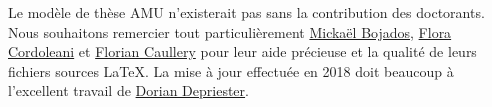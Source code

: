 Le modèle de thèse AMU n'existerait pas sans la contribution des doctorants. Nous souhaitons remercier tout particulièrement \href{http://www.theses.fr/2011AIX20720}{Mickaël Bojados}, \href{http://www.theses.fr/2011AIX22111}{Flora Cordoleani} et \href{http://www.theses.fr/2014AIXM4013}{Florian Caullery} pour leur aide précieuse et la qualité de leurs fichiers sources LaTeX. La mise à jour effectuée en 2018 doit beaucoup à l'excellent travail de \href{http://theses.fr/2014ENMP0038}{Dorian Depriester}.

\lipsum[1-2]
